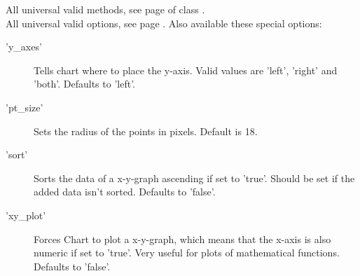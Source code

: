 \Methods
All universal valid methods, see page \pageref{methods} of class . \\[\parabstand]
%
\Attributes
All universal valid options, see page \pageref{options}. 
Also available these special options:
\begin{description}
\item['y\_axes'] Tells chart where to place the y-axis. 
                 Valid values are 'left', 'right' and 'both'. Defaults to 'left'.
                 
\item['pt\_size'] Sets the radius of the points in pixels. Default is 18.

\item['sort'] Sorts the data of a x-y-graph ascending if set to 'true'. 
              Should be set if the added data isn't sorted. Defaults to 'false'.
              
\item['xy\_plot'] Forces Chart to plot a x-y-graph, 
                  which means that the x-axis is also numeric if set to 'true'. 
                   Very useful for plots of mathematical functions. Defaults to 'false'.
\end{description}
